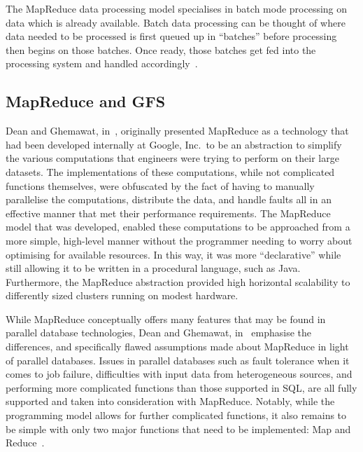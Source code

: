 The MapReduce data processing model specialises in batch mode processing on data which is already available.
Batch data processing can be thought of where data needed to be processed is first queued up in ``batches''
before processing then begins on those batches. Once ready, those batches get fed into the processing system
and handled accordingly~\cite{condie2010online}.


\subsection{MapReduce and GFS} %
\label{ssub:mapreduce_and_gfs}

Dean and Ghemawat, in~\cite{dean_mapreduce:_2008}, originally presented MapReduce as a technology that had been
developed internally at Google, Inc.\ to be an abstraction to simplify the various computations that engineers were
trying to perform on their large datasets. The implementations of these computations, while not complicated functions
themselves, were obfuscated by the fact of having to manually parallelise the computations, distribute the data, and
handle faults all in an effective manner that met their performance requirements. The MapReduce model that was developed,
enabled these computations to be approached from a more simple, high-level manner without the programmer needing to worry
about optimising for available resources. In this way, it was more ``declarative'' while still allowing it to be written
in a procedural language, such as Java. Furthermore, the MapReduce abstraction provided high horizontal scalability to
differently sized clusters running on modest hardware.

While MapReduce conceptually offers many features that may be found in parallel database technologies, Dean and
Ghemawat, in~\cite{dean2010mapreduce} emphasise the differences, and specifically flawed assumptions made about MapReduce
in light of parallel databases. Issues in parallel databases such as fault tolerance when it comes to job failure,
difficulties with input data from heterogeneous sources, and performing more complicated functions than those supported
in SQL, are all fully supported and taken into consideration with MapReduce. Notably, while the programming model
allows for further complicated functions, it also remains to be simple with only two major functions that need to be
implemented: Map and Reduce~\cite{pavlo2009comparison}.

